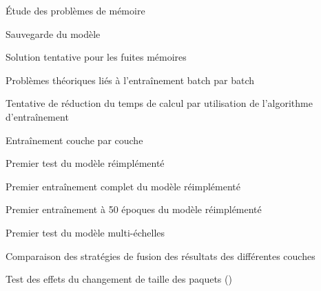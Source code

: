 \newpage
\begin{report}{Étude des problèmes de mémoire}
	
\end{report}
\begin{report}{Sauvegarde du modèle}
	
\end{report}
\begin{report}{Solution tentative pour les fuites mémoires}
	
\end{report}
\begin{report}{Problèmes théoriques liés à l'entraînement batch par batch}
	
\end{report}
\begin{report}{Tentative de réduction du temps de calcul par utilisation de l'algorithme d'entraînement \og{}\fg{}}
	
\end{report}
\begin{report}{Entraînement couche par couche}
	
\end{report}


\begin{report}{Premier test du modèle réimplémenté}
	
\end{report}
\begin{report}{Premier entraînement complet du modèle réimplémenté}
	
\end{report}
\begin{report}{Premier entraînement à 50 époques du modèle réimplémenté}
	
\end{report}
\begin{report}{Premier test du modèle multi-échelles}
	
\end{report}
\begin{report}{Comparaison des stratégies de fusion des résultats des différentes couches}
	
\end{report}
\begin{report}{Test des effets du changement de taille des paquets ()}
	
\end{report}


